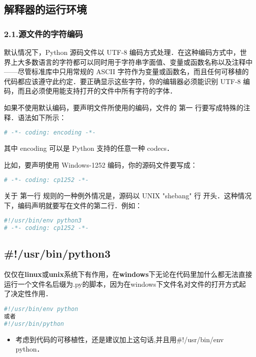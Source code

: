 \subsection{解释器的运行环境}

\subsubsection{2.1.源文件的字符编码}

默认情况下，Python 源码文件以 UTF-8 编码方式处理．在这种编码方式中，世界上大多数语言的字符都可以同时用于字符串字面值、变量或函数名称以及注释中——尽管标准库中只用常规的 ASCII 字符作为变量或函数名，而且任何可移植的代码都应该遵守此约定．要正确显示这些字符，你的编辑器必须能识别 UTF-8 编码，而且必须使用能支持打开的文件中所有字符的字体．

如果不使用默认编码，要声明文件所使用的编码，文件的 第一 行要写成特殊的注释．语法如下所示：

\begin{lstlisting}[language=python]
# -*- coding: encoding -*-
\end{lstlisting}
其中 encoding 可以是 Python 支持的任意一种 codecs．

比如，要声明使用 Windows-1252 编码，你的源码文件要写成：

\begin{lstlisting}[language=python]
# -*- coding: cp1252 -*-
\end{lstlisting}
关于 第一行 规则的一种例外情况是，源码以 UNIX "shebang" 行 开头．这种情况下，编码声明就要写在文件的第二行．例如：

\begin{lstlisting}[language=python]
#!/usr/bin/env python3
# -*- coding: cp1252 -*-
\end{lstlisting}

\subsection{#!/usr/bin/python3 }
仅仅在\textbf{linux}或\textbf{unix}系统下有作用，在\textbf{windows}下无论在代码里加什么都无法直接运行一个文件名后缀为.py的脚本，因为在windows下文件名对文件的打开方式起了决定性作用．
\begin{lstlisting}[language=python]
#!/usr/bin/env python
或者
#!/usr/bin/python
\end{lstlisting}
\begin{itemize}
\item 考虑到代码的可移植性，还是建议加上这句话,并且用#!/usr/bin/env python．
\end{itemize}

